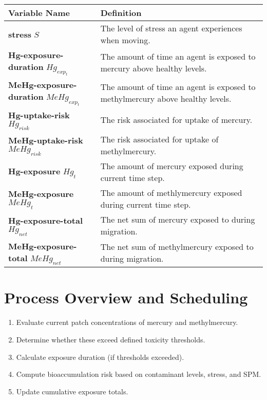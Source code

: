 \documentclass[
]{book}
\begin{document}
\begin{longtable}[]{@{}
  >{\raggedright\arraybackslash}p{}
  >{\raggedright\arraybackslash}p{}@{}}
\toprule\noalign{}
\begin{minipage}[b]{\linewidth}\raggedright
Variable Name
\end{minipage} & \begin{minipage}[b]{\linewidth}\raggedright
Definition
\end{minipage} \\
\midrule\noalign{}
\endhead
\bottomrule\noalign{}
\endlastfoot
\textbf{stress} \(S\) & The level of stress an agent experiences when moving. \\
\textbf{Hg-exposure-duration} \(Hg_{exp_t}\) & The amount of time an agent is exposed to mercury above healthy levels. \\
\textbf{MeHg-exposure-duration} \(MeHg_{exp_t}\) & The amount of time an agent is exposed to methylmercury above healthy levels. \\
\textbf{Hg-uptake-risk} \(Hg_{risk}\) & The risk associated for uptake of mercury. \\
\textbf{MeHg-uptake-risk} \(MeHg_{risk}\) & The risk associated for uptake of methylmercury. \\
\textbf{Hg-exposure} \(Hg_{t}\) & The amount of mercury exposed during current time step. \\
\textbf{MeHg-exposure} \(MeHg_{t}\) & The amount of methlymercury exposed during current time step. \\
\textbf{Hg-exposure-total} \(Hg_{net}\) & The net sum of mercury exposed to during migration. \\
\textbf{MeHg-exposure-total} \(MeHg_{net}\) & The net sum of methylmercury exposed to during migration. \\
\end{longtable}

\section{Process Overview and Scheduling}\label{process-overview-and-scheduling-1}

\begin{enumerate}
\def\labelenumi{\arabic{enumi}.}
\item
  Evaluate current patch concentrations of mercury and methylmercury.
\item
  Determine whether these exceed defined toxicity thresholds.
\item
  Calculate exposure duration (if thresholds exceeded).
\item
  Compute bioaccumulation risk based on contaminant levels, stress, and SPM.
\item
  Update cumulative exposure totals.
\end{enumerate}
\end{document}
